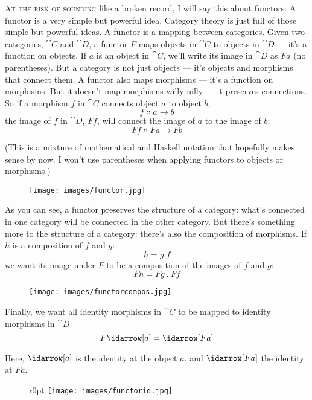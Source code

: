 
\lettrine[lhang=0.17]{A}{t the risk of sounding} like a broken record, I will say this about
functors: A functor is a very simple but powerful idea. Category theory
is just full of those simple but powerful ideas. A functor is a mapping
between categories. Given two categories, $\cat{C}$ and $\cat{D}$, a functor $F$ maps
objects in $\cat{C}$ to objects in $\cat{D}$ --- it's a function on objects. If $a$
is an object in $\cat{C}$, we'll write its image in $\cat{D}$ as $F a$ (no
parentheses). But a category is not just objects --- it's objects and
morphisms that connect them. A functor also maps morphisms --- it's a
function on morphisms. But it doesn't map morphisms willy-nilly --- it
preserves connections. So if a morphism $f$ in $\cat{C}$ connects object
$a$ to object $b$,
\[f \Colon a \to b\]
the image of $f$ in $\cat{D}$, $F f$, will connect the image of
$a$ to the image of $b$:
\[F f \Colon F a \to F b\]

(This is a mixture of mathematical and Haskell notation that hopefully
makes sense by now. I won't use parentheses when applying functors to
objects or morphisms.)

\begin{figure}[H]
\centering\texttt{[image: images/functor.jpg]}
\end{figure}

\noindent
As you can see, a
functor preserves the structure of a category: what's connected in one
category will be connected in the other category. But there's something
more to the structure of a category: there's also the composition of
morphisms. If $h$ is a composition of $f$ and $g$:
\[h = g . f\]
we want its image under $F$ to be a composition of the images of $f$
and $g$:
\[F h = F g~.~F f\]

\begin{figure}[H]
\centering
\texttt{[image: images/functorcompos.jpg]}
\end{figure}

\noindent
Finally, we want all identity morphisms in $\cat{C}$ to be mapped to identity morphisms in
$\cat{D}$:
\[F \idarrow[a] = \idarrow[F a]\]

\noindent
Here, $\idarrow[a]$ is the identity at the object $a$,
and $\idarrow[F a]$ the identity at $F a$.

\begin{figure}{r}{0pt}
\texttt{[image: images/functorid.jpg]}
\end{figure}

